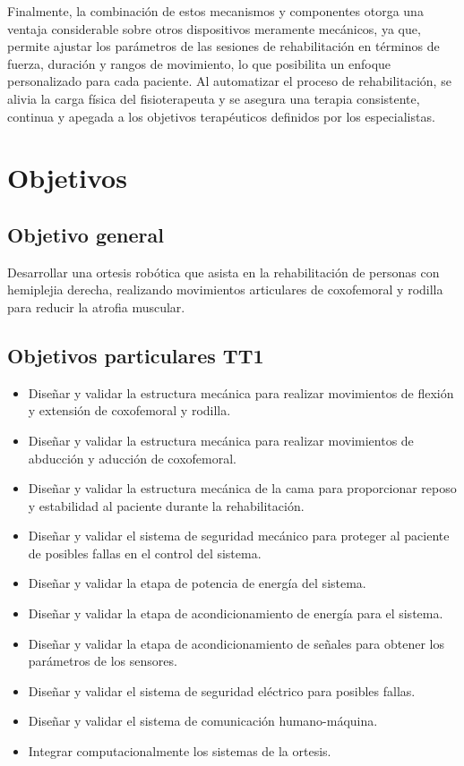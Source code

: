 Finalmente, la combinación de estos mecanismos y componentes otorga una ventaja considerable sobre otros dispositivos meramente mecánicos, ya que, permite ajustar los parámetros de las sesiones de rehabilitación en términos de fuerza, duración y rangos de movimiento, lo que posibilita un enfoque personalizado para cada paciente. Al automatizar el proceso de rehabilitación, se alivia la carga física del fisioterapeuta y se asegura una terapia consistente, continua y apegada a los objetivos terapéuticos definidos por los especialistas.

\section{Objetivos}
\subsection{Objetivo general}
Desarrollar una ortesis robótica que asista en la rehabilitación de personas con hemiplejia derecha, realizando movimientos articulares de coxofemoral y rodilla para reducir la atrofia muscular.
\clearpage
\subsection{Objetivos particulares TT1}
\begin{itemize}
	\item Diseñar y validar la estructura mecánica para realizar movimientos de flexión y extensión de coxofemoral y rodilla.
	\item	Diseñar y validar la estructura mecánica para realizar movimientos de abducción y aducción de coxofemoral. 
	\item	Diseñar y validar la estructura mecánica de la cama para proporcionar reposo y estabilidad al paciente durante la rehabilitación.
	\item	Diseñar y validar el sistema de seguridad mecánico para proteger al paciente de posibles fallas en el control del sistema.
	\item	Diseñar y validar la etapa de potencia de energía del sistema.
	\item	Diseñar y validar la etapa de acondicionamiento de energía para el sistema.
	\item	Diseñar y validar la etapa de acondicionamiento de señales para obtener los parámetros de los sensores. 
	\item	Diseñar y validar el sistema de seguridad eléctrico para posibles fallas.
	\item	Diseñar y validar el sistema de comunicación humano-máquina.
	\item	Integrar computacionalmente los sistemas de la ortesis.
\end{itemize}

